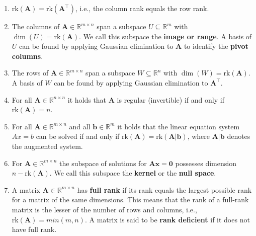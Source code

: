 \begin{enumerate}
    \item $\text{rk}(\bm{A}) = \text{rk}(\bm{A}^\top)$, i.e., the column rank equals the row rank.
    \hfill \cite{mfml/book/mml/Deisenroth-Faisal-Ong}

    \item The columns of $\bm{A} \in \mathbb{R}^{m\times n}$ span a subspace $U \subseteq \mathbb{R}^m$ with $\dim(U) = \text{rk}(\bm{A})$. 
    We call this subspace the \textbf{image or range}. 
    A basis of $U$ can be found by applying Gaussian elimination to $\bm{A}$ to identify the \textbf{pivot columns}.
    \hfill \cite{mfml/book/mml/Deisenroth-Faisal-Ong}

    \item The rows of $\bm{A} \in  \mathbb{R}^{m\times n}$  span a subspace $W \subseteq \mathbb{R}^n$ with $\dim(W) = \text{rk}(\bm{A})$. 
    A basis of $W$ can be found by applying Gaussian elimination to $\bm{A}^\top$.
    \hfill \cite{mfml/book/mml/Deisenroth-Faisal-Ong}

    \item For all $\bm{A} \in  \mathbb{R}^{n\times n}$ it holds that $\bm{A}$ is regular (invertible) if and only if $\text{rk}(\bm{A}) = n$.
    \hfill \cite{mfml/book/mml/Deisenroth-Faisal-Ong}

    \item For all $\bm{A} \in  \mathbb{R}^{m\times n}$  and all $\bm{b} \in  \mathbb{R}^m$ it holds that the linear equation system $Ax = b$ can be solved if and only if $\text{rk}(\bm{A}) = \text{rk}(\bm{A}|\bm{b})$, where $\bm{A}|\bm{b}$ denotes the augmented system.
    \hfill \cite{mfml/book/mml/Deisenroth-Faisal-Ong}

    \item For $\bm{A} \in  \mathbb{R}^{m\times n}$  the subspace of solutions for $\bm{A}\bm{x} = \bm{0}$ possesses dimension $n - \text{rk}(\bm{A})$. 
    We call this subspace the \textbf{kernel} or the \textbf{null space}.
    \hfill \cite{mfml/book/mml/Deisenroth-Faisal-Ong}

    \item A matrix $\bm{A} \in  \mathbb{R}^{m\times n}$  has \textbf{full rank} if its rank equals the largest possible rank for a matrix of the same dimensions. 
    This means that the rank of a full-rank matrix is the lesser of the number of rows and columns, i.e., $\text{rk}(\bm{A}) = min(m, n)$. 
    A matrix is said to be \textbf{rank deficient} if it does not have full rank.
    \hfill \cite{mfml/book/mml/Deisenroth-Faisal-Ong}

    
\end{enumerate}



